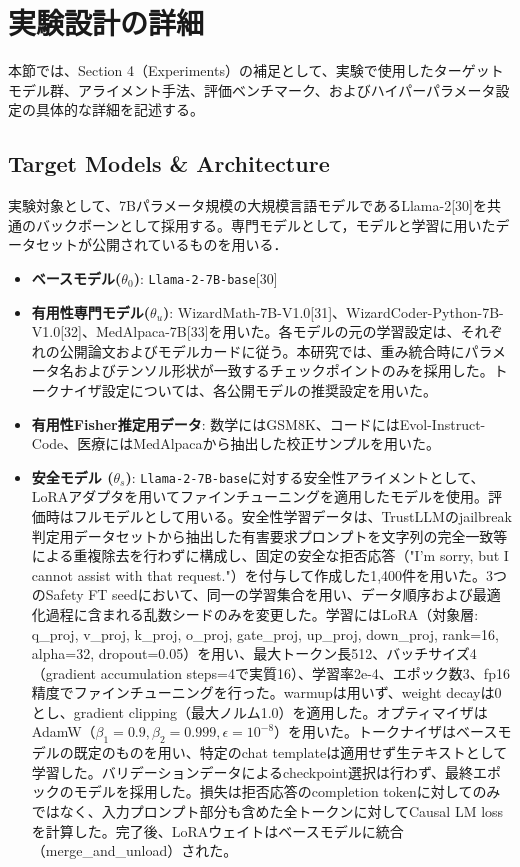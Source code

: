 \documentclass{article}
\begin{document}
\section{実験設計の詳細}
\label{app:実験設計の詳細}
本節では、Section 4（Experiments）の補足として、実験で使用したターゲットモデル群、アライメント手法、評価ベンチマーク、およびハイパーパラメータ設定の具体的な詳細を記述する。

\subsection{Target Models \& Architecture}
実験対象として、7Bパラメータ規模の大規模言語モデルであるLlama-2[30]を共通のバックボーンとして採用する。専門モデルとして，モデルと学習に用いたデータセットが公開されているものを用いる．


\begin{itemize}
\item \textbf{ベースモデル($\theta_0$)}: \texttt{Llama-2-7B-base}[30]
\item \textbf{有用性専門モデル($\theta_u$)}: WizardMath-7B-V1.0[31]、WizardCoder-Python-7B-V1.0[32]、MedAlpaca-7B[33]を用いた。各モデルの元の学習設定は、それぞれの公開論文およびモデルカードに従う。本研究では、重み統合時にパラメータ名およびテンソル形状が一致するチェックポイントのみを採用した。トークナイザ設定については、各公開モデルの推奨設定を用いた。
\item \textbf{有用性Fisher推定用データ}: 数学にはGSM8K、コードにはEvol-Instruct-Code、医療にはMedAlpacaから抽出した校正サンプルを用いた。
\item \textbf{安全モデル ($\theta_s$)}: \texttt{Llama-2-7B-base}に対する安全性アライメントとして、LoRAアダプタを用いてファインチューニングを適用したモデルを使用。評価時はフルモデルとして用いる。安全性学習データは、TrustLLMのjailbreak判定用データセットから抽出した有害要求プロンプトを文字列の完全一致等による重複除去を行わずに構成し、固定の安全な拒否応答（"I'm sorry, but I cannot assist with that request."）を付与して作成した1,400件を用いた。3つのSafety FT seedにおいて、同一の学習集合を用い、データ順序および最適化過程に含まれる乱数シードのみを変更した。学習にはLoRA（対象層: q\_proj, v\_proj, k\_proj, o\_proj, gate\_proj, up\_proj, down\_proj, rank=16, alpha=32, dropout=0.05）を用い、最大トークン長512、バッチサイズ4（gradient accumulation steps=4で実質16）、学習率2e-4、エポック数3、fp16精度でファインチューニングを行った。warmupは用いず、weight decayは0とし、gradient clipping（最大ノルム1.0）を適用した。オプティマイザはAdamW（\(\beta_1=0.9, \beta_2=0.999, \epsilon=10^{-8}\)）を用いた。トークナイザはベースモデルの既定のものを用い、特定のchat templateは適用せず生テキストとして学習した。バリデーションデータによるcheckpoint選択は行わず、最終エポックのモデルを採用した。損失は拒否応答のcompletion tokenに対してのみではなく、入力プロンプト部分も含めた全トークンに対してCausal LM lossを計算した。完了後、LoRAウェイトはベースモデルに統合（merge\_and\_unload）された。
\end{itemize}
\end{document}
